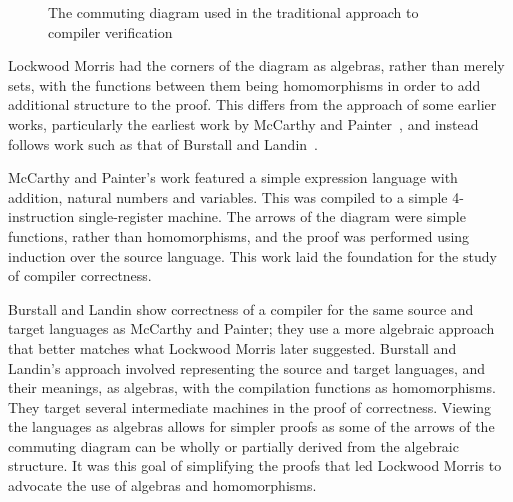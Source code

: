\documentclass[a4paper,10pt]{report}
\begin{document}
\begin{figure}[ht]
  \begin{center}
  \end{center}
  \caption{The commuting diagram used in the traditional approach to compiler verification}
  \label{commuting-diagram}
\end{figure}

Lockwood Morris had the corners of the diagram as algebras, rather than merely
sets, with the functions between them being homomorphisms in order to add
additional structure to the proof.  This differs from the approach of some
earlier works, particularly the earliest work by McCarthy and
Painter~\cite{mccarthy1967}, and instead follows work such as that of Burstall
and Landin~\cite{burstall1969}.

McCarthy and Painter's work featured a simple expression language with addition,
natural numbers and variables.  This was compiled to a simple 4-instruction
single-register machine.  The arrows of the diagram were simple functions,
rather than homomorphisms, and the proof was performed using induction over the
source language. This work laid the foundation for the study of compiler
correctness.

Burstall and Landin show correctness of a compiler for the same source and
target languages as McCarthy and Painter; they use a more algebraic approach
that better matches what Lockwood Morris later suggested.  Burstall and Landin's
approach involved representing the source and target languages, and their
meanings, as algebras, with the compilation functions as homomorphisms. They
target several intermediate machines in the proof of correctness. Viewing the
languages as algebras allows for simpler proofs as some of the arrows of the
commuting diagram can be wholly or partially derived from the algebraic
structure. It was this goal of simplifying the proofs that led Lockwood Morris
to advocate the use of algebras and homomorphisms.
\end{document}
